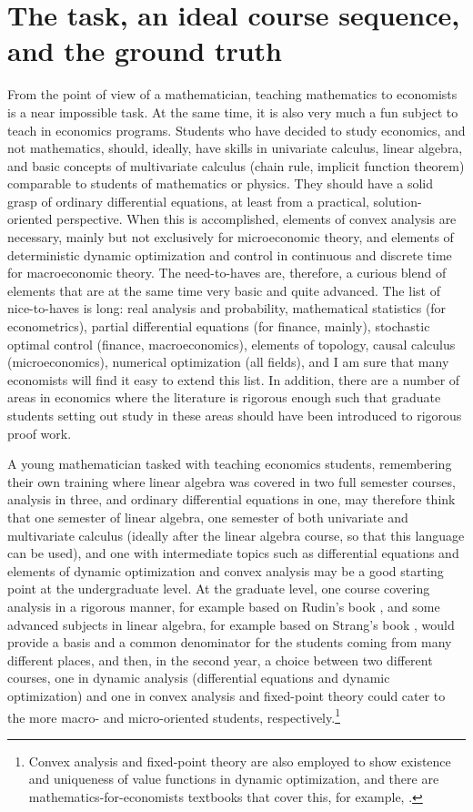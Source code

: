 \documentclass[graybox]{svmult}
\begin{document}
\section{The task, an ideal course sequence, and the ground truth}
\label{sec:1}
From the point of view of a mathematician, teaching mathematics to economists is a near impossible task. At the same time, it is also very much a fun subject to teach in economics programs. Students who have decided to study economics, and not mathematics, should, ideally, have skills in univariate calculus, linear algebra, and basic concepts of multivariate calculus (chain rule, implicit function theorem) comparable to students of mathematics or physics. They should have a solid grasp of ordinary differential equations, at least from a practical, solution-oriented perspective. When this is accomplished, elements of convex analysis are necessary, mainly but not exclusively for microeconomic theory, and elements of deterministic dynamic optimization and control in continuous and discrete time for macroeconomic theory. The need-to-haves are, therefore, a curious blend of elements that are at the same time very basic and quite advanced. The list of nice-to-haves is long: real analysis and probability, mathematical statistics (for econometrics), partial differential equations (for finance, mainly), stochastic optimal control (finance, macroeconomics), elements of topology, causal calculus (microeconomics), numerical optimization (all fields), and I am sure that many economists will find it easy to extend this list. In addition, there are a number of areas in economics where the literature is rigorous enough such that graduate students setting out study in these areas should have been introduced to rigorous proof work.

A young mathematician tasked with teaching economics students, remembering their own training where linear algebra was covered in two full semester courses, analysis in three, and ordinary differential equations in one, may therefore think that one semester of linear algebra, one semester of both univariate and multivariate calculus (ideally after the linear algebra course, so that this language can be used), and one with intermediate topics such as differential equations and elements of dynamic optimization and convex analysis may be a good starting point at the undergraduate level. At the graduate level, one course covering analysis in a rigorous manner, for example based on Rudin's book \citep{Rudin1976}, and some advanced subjects in linear algebra, for example based on Strang's book \citep{Strang2023}, would provide a basis and a common denominator for the students coming from many different places, and then, in the second year, a choice between two different courses, one in dynamic analysis (differential equations and dynamic optimization) and one in convex analysis and fixed-point theory could cater to the more macro- and micro-oriented students, respectively.\footnote{Convex analysis and fixed-point theory are also employed to show existence and uniqueness of value functions in dynamic optimization, and there are mathematics-for-economists textbooks that cover this, for example, \cite{Corbae2009}.}
\end{document}
